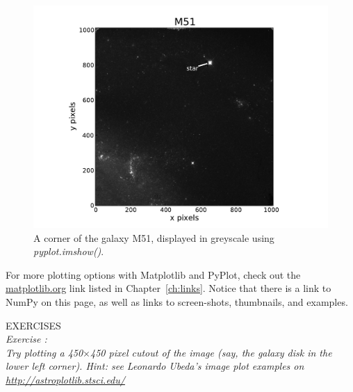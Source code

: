 \begin{figure}[tbp]
  \centering
    \includegraphics[scale=0.70]{M51.pdf}
    \caption{A corner of the galaxy M51, displayed in greyscale using \textit{pyplot.imshow()}.}
  \label{fig:M51}
\end{figure}

For more
plotting options with Matplotlib and PyPlot, check out the 
\href{http://matplotlib.org/}{matplotlib.org} link listed in
Chapter~\ref{ch:links}.  Notice that there is a link to NumPy on this
page, as well as links to screen-shots, thumbnails, and examples.


{\color{blue} {\sf\small EXERCISES}} \\
{\it Exercise  :  \\
Try plotting a 450$\times$450 pixel cutout of the image (say, the galaxy disk in the lower left corner).
Hint: see Leonardo Ubeda's image plot examples on \href{http://astroplotlib.stsci.edu/}
{http://astroplotlib.stsci.edu/}}


